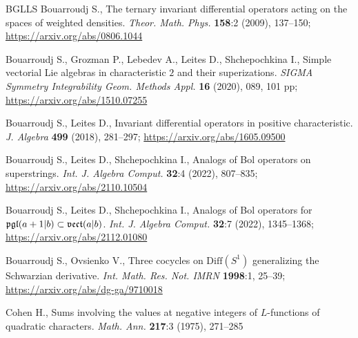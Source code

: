 \documentclass[12pt,a4paper]{amsart}
\theoremstyle{thm}
\theoremstyle{definition}
\begin{document}
\begin{thebibliography}{BGLLS}
Bouarroudj S., The ternary invariant differential operators acting on the spaces of weighted
densities. \textit{Theor. Math. Phys.} \textbf{158}:2 (2009), 137--150;
\url{https://arxiv.org/abs/0806.1044}



Bouarroudj S., Grozman P., Lebedev A., Leites D., Shchepochkina I., Simple vectorial Lie
algebras in characteristic $2$ and their superizations. \textit{SIGMA Symmetry Integrability
Geom. Methods Appl.} \textbf{16} (2020), 089, 101 pp; \url{https://arxiv.org/abs/1510.07255}

Bouarroudj S., Leites D., Invariant differential operators in positive characteristic.
\textit{J. Algebra} \textbf{499} (2018), 281--297; \url{https://arxiv.org/abs/1605.09500}

Bouarroudj S., Leites D., Shchepochkina I., Analogs of Bol operators on superstrings.
\textit{Int. J. Algebra Comput.} \textbf{32}:4 (2022), 807--835;
\url{https://arxiv.org/abs/2110.10504}

Bouarroudj S., Leites D., Shchepochkina I., Analogs of Bol operators for
${\mathfrak{pgl}}(a+1\vert b)\subset {\mathfrak{vect}}(a\vert b)$. \textit{Int. J. Algebra Comput.} \textbf{32}:7
(2022), 1345--1368; \url{https://arxiv.org/abs/2112.01080}

Bouarroudj S., Ovsienko V., Three cocycles on $\text{Diff}(S^1)$ generalizing the Schwarzian
derivative. \textit{Int. Math. Res. Not. IMRN} \textbf{1998}:1, 25--39;
\url{https://arxiv.org/abs/dg-ga/9710018}


Cohen H., Sums involving the values at negative integers of $L$-functions of quadratic
characters. \textit{Math. Ann.} \textbf{217}:3 (1975), 271--285


\end{thebibliography}
\end{document}
